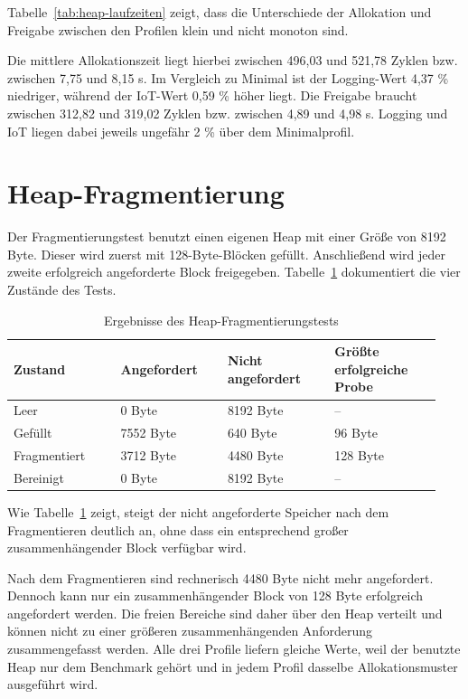 Tabelle~\ref{tab:heap-laufzeiten} zeigt, dass die Unterschiede der Allokation und Freigabe zwischen den Profilen klein und nicht monoton sind.

Die mittlere Allokationszeit liegt hierbei zwischen 496,03 und 521,78 Zyklen bzw. zwischen 7,75 und 8,15 \textmu{}s. Im Vergleich zu Minimal ist der Logging-Wert 4,37 \% niedriger, w{\"a}hrend der IoT-Wert 0,59 \% h{\"o}her liegt. Die Freigabe braucht zwischen 312,82 und 319,02 Zyklen bzw. zwischen 4,89 und 4,98 \textmu{}s. Logging und IoT liegen dabei jeweils ungef{\"a}hr 2 \% {\"u}ber dem Minimalprofil.

\section{Heap-Fragmentierung}
Der Fragmentierungstest benutzt einen eigenen Heap mit einer Gr{\"o}{\ss}e von 8192 Byte. Dieser wird zuerst mit 128-Byte-Bl{\"o}cken gef{\"u}llt. Anschlie{\ss}end wird jeder zweite erfolgreich angeforderte Block freigegeben. Tabelle~\ref{tab:heap-fragmentierung} dokumentiert die vier Zust{\"a}nde des Tests.

\begin{longtable}{p{0.235\linewidth}p{0.235\linewidth}p{0.235\linewidth}p{0.235\linewidth}}
\caption{Ergebnisse des Heap-Fragmentierungstests}\label{tab:heap-fragmentierung}\\
\toprule
\textbf{Zustand} & \textbf{Angefordert} & \textbf{Nicht angefordert} & \textbf{Gr{\"o}{\ss}te erfolgreiche Probe} \\
\midrule
Leer & 0 Byte & 8192 Byte & -- \\
Gef{\"u}llt & 7552 Byte & 640 Byte & 96 Byte \\
Fragmentiert & 3712 Byte & 4480 Byte & 128 Byte \\
Bereinigt & 0 Byte & 8192 Byte & -- \\
\bottomrule
\end{longtable}

Wie Tabelle~\ref{tab:heap-fragmentierung} zeigt, steigt der nicht angeforderte Speicher nach dem Fragmentieren deutlich an, ohne dass ein entsprechend gro{\ss}er zusammenh{\"a}ngender Block verf{\"u}gbar wird.

Nach dem Fragmentieren sind rechnerisch 4480 Byte nicht mehr angefordert. Dennoch kann nur ein zusammenh{\"a}ngender Block von 128 Byte erfolgreich angefordert werden. Die freien Bereiche sind daher {\"u}ber den Heap verteilt und k{\"o}nnen nicht zu einer gr{\"o}{\ss}eren zusammenh{\"a}ngenden Anforderung zusammengefasst werden. Alle drei Profile liefern gleiche Werte, weil der benutzte Heap nur dem Benchmark geh{\"o}rt und in jedem Profil dasselbe Allokationsmuster ausgef{\"u}hrt wird.

